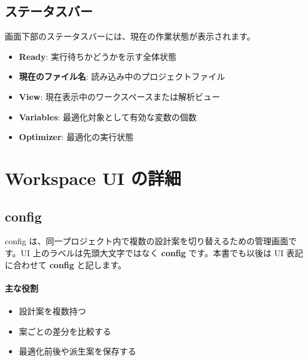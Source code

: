 \documentclass[11pt]{article}
\begin{document}
\subsection{ステータスバー}
画面下部のステータスバーには、現在の作業状態が表示されます。
\begin{itemize}
  \item \textbf{Ready}: 実行待ちかどうかを示す全体状態
  \item \textbf{現在のファイル名}: 読み込み中のプロジェクトファイル
  \item \textbf{View}: 現在表示中のワークスペースまたは解析ビュー
  \item \textbf{Variables}: 最適化対象として有効な変数の個数
  \item \textbf{Optimizer}: 最適化の実行状態
\end{itemize}

\section{Workspace UI の詳細}
\subsection{config}
config は、同一プロジェクト内で複数の設計案を切り替えるための管理画面です。UI 上のラベルは先頭大文字ではなく \textbf{config} です。本書でも以後は UI 表記に合わせて \textbf{config} と記します。

\paragraph{主な役割}
\begin{itemize}
  \item 設計案を複数持つ
  \item 案ごとの差分を比較する
  \item 最適化前後や派生案を保存する
\end{itemize}
\end{document}
